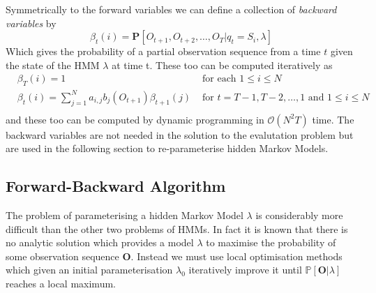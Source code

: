 Symmetrically to the forward variables we can define a collection of \emph{backward variables} by
\begin{equation*}
\beta_t(i) = \mathbf{P}[O_{t+1}, O_{t+2}, \dots, O_T | q_t = S_i, \lambda]
\end{equation*}
Which gives the probability of a partial observation sequence from a time $t$ given the state of the HMM $\lambda$ at time t. These too can be computed iteratively as
\begin{align*}
&\beta_T(i) = 1 &\text{ for each } 1 \leq i \leq N \\
&\beta_t(i)  = \sum_{j=1}^N a_{i,j}b_j(O_{t+1})\beta_{t+1}(j) &\text{ for } t = T-1, T-2,\dots,1 \text{ and } 1 \leq i \leq N \\
\end{align*}
and these too can be computed by dynamic programming in $\mathcal{O}(N^2T)$ time. The backward variables are not needed in the solution to the evalutation problem but are used in the following section to re-parameterise hidden Markov Models. 

\subsection{Forward-Backward Algorithm}
The problem of parameterising a hidden Markov Model $\lambda$ is considerably more difficult than the other two problems of HMMs. In fact it is known that there is no analytic solution which provides a model $\lambda$ to maximise the probability of some observation sequence $\bm{O}$. Instead we must use local optimisation methods which given an initial parameterisation $\lambda_0$ iteratively improve it until $\mathbb{P}[\bm{O} | \lambda]$ reaches a local maximum. 

